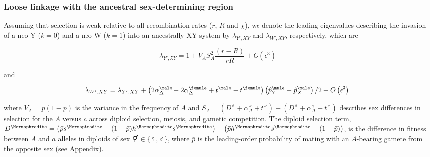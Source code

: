 \documentclass[12pt]{article}
\begin{document}
\subsubsection*{Loose linkage with the ancestral sex-determining region}

Assuming that selection is weak relative to all recombination rates ($r$, $R$ and $\chi$), we denote the leading eigenvalues describing the invasion of a neo-Y ($k=0$) and a neo-W ($k=1$) into an ancestrally XY system by $\lambda_{Y',XY}$ and $\lambda_{W',XY}$, respectively, which are

\begin{equation}
\lambda_{Y',XY} =1+ V_{A}S_{A}^2\frac{ \left( r-R \right) }{r R}+O\left(\epsilon^3 \right) 
\label{eq:lambda_neoY}
\end{equation}

\noindent 
and 

\begin{equation}
\lambda_{W',XY} =\lambda_{Y',XY}+\left(2\alpha_{\Delta}^\male-2\alpha_{\Delta}^\female+t^\male-t^\female \right) \left( \hat{p}^\male_Y-\hat{p}^\male_X \right)/2
+O\left(\epsilon^3 \right) \\
\label{eq:lambda_neoW}
\end{equation}

\noindent
where $V_{A}=\bar{p}(1-\bar{p})$ is the variance in the frequency of $A$ and $S_{A}=(D^\male +\alpha_{\Delta}^\male+t^\male) - (D^\female+\alpha_{\Delta}^\female+t^\female)$ describes sex differences in selection for the $A$ versus $a$ across diploid selection, meiosis, and gametic competition.
The diploid selection term, $D^\Hermaphrodite=\big{(} \bar{p}s^\Hermaphrodite+(1-\bar{p})h^\Hermaphrodite s^\Hermaphrodite\big{)} -\big{(} \bar{p}h^\Hermaphrodite s^\Hermaphrodite+(1-\bar{p}) \big{)}$, is the difference in fitness between $A$ and $a$ alleles in diploids of sex $\Hermaphrodite \in \{\female,\male\}$, where $\bar{p}$ is the leading-order probability of mating with an $A$-bearing gamete from the opposite sex (see Appendix). 
\end{document}
